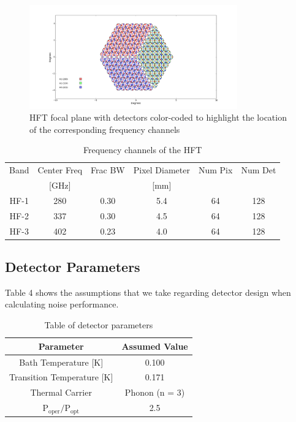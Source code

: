 \documentclass[12pt, titlepage]{article} %
\begin{document}
\begin{figure}[h!]
	\centering
	\includegraphics[trim={10.0cm, 1.0cm, 10.0cm, 0.0cm}, width=0.8\textwidth]{PNG/HFT_Ted.png}
	\caption{HFT focal plane with detectors color-coded to highlight the location of the corresponding frequency channels \label{fig:hftFP}}
\end{figure}

\begin{table}[h!]
\centering
	\begin{tabu}{|| c | c | c | c | c | c ||}
	\hline
	Band & Center Freq & Frac BW & Pixel Diameter & Num Pix & Num Det \\
	 & [GHz] & & [mm] & & \\
	\hline \hline
	\rowfont{\color{Red}}
	HF-1 & 280 & 0.30 & 5.4 & 64 & 128 \\
	\hline
	\rowfont{\color{Green}}
	HF-2 & 337 & 0.30 & 4.5 & 64 & 128 \\
	\hline
	\rowfont{\color{Blue}}	
	HF-3 & 402 & 0.23 & 4.0 & 64 & 128 \\
	\hline
	\end{tabu}
\caption{Frequency channels of the HFT \label{table:hftParams}}
\end{table} 


\subsection{Detector Parameters}

Table 4 shows the assumptions that we take regarding detector design when calculating noise performance.

\begin{table}[H]
\centering
	\begin{tabular}{|| c | c ||}
	\hline
	Parameter & Assumed Value \\
	\hline
	\hline
	Bath Temperature [K] & 0.100 \\ 
	\hline
	Transition Temperature [K] & 0.171 \\
	\hline
	Thermal Carrier & Phonon (n = 3) \\
 	\hline
	$\mathrm{P_{oper}/P_{opt}}$ & 2.5 \\
	\hline
	\end{tabular}
\caption{Table of detector parameters}
\end{table}
\end{document}
